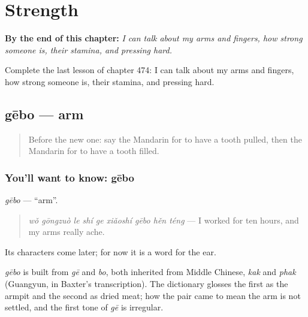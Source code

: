 
\chapter{Strength}
\label{ch:zh-strength}

\begin{chapteropening}
\textbf{By the end of this chapter:} \emph{I can talk about my arms and fingers, how strong someone is, their stamina, and pressing hard.}

Complete the last lesson of chapter 474: I can talk about my arms and fingers, how strong someone is, their stamina, and pressing hard.
\end{chapteropening}

\section[gēbo]{gēbo — arm}

\label{lesson:ZH-C474-gebo}



\begin{quote}
Before the new one: say the Mandarin for to have a tooth pulled, then the Mandarin for to have a tooth filled.
\end{quote}

\subsection*{You'll want to know: gēbo}
\emph{gēbo} — \textquotedblleft{}arm\textquotedblright{}.

\begin{quote}
\emph{wǒ gōngzuò le shí ge xiǎoshí gēbo hěn téng} — I worked for ten hours, and my arms really ache.
\end{quote}

Its characters come later; for now it is a word for the ear.

\begin{cousinweb}
\emph{gēbo} is built from \emph{gē} and \emph{bo}, both inherited from Middle Chinese, \emph{kak} and \emph{phak} (Guangyun, in Baxter's transcription). The dictionary glosses the first as the armpit and the second as dried meat; how the pair came to mean the arm is not settled, and the first tone of \emph{gē} is irregular.
\end{cousinweb}

